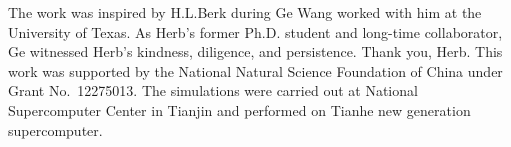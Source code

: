 \documentclass[showkeys,reprint,superscriptaddress]{revtex4-2}
\begin{document}




\begin{acknowledgments}
    The work was inspired by H.L.Berk during Ge Wang worked with him at the University of Texas.
    As Herb’s former Ph.D. student and long-time collaborator, Ge witnessed Herb’s kindness, diligence, and persistence. Thank you, Herb. 
    This work was supported by the National Natural Science Foundation of China under Grant No.~12275013.
    The simulations were carried out at National Supercomputer Center in Tianjin and  performed on Tianhe new generation supercomputer.
\end{acknowledgments}

%

\end{document}
